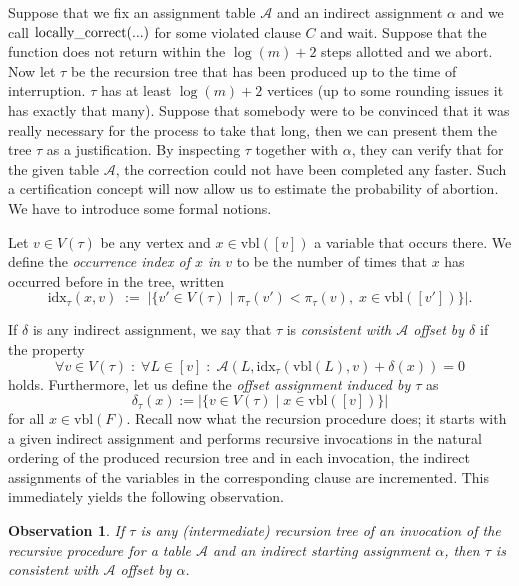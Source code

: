 \documentclass[11pt,a4paper]{article}
\newtheorem{observation}[theorem]{Observation}
\newcommand{\Function}[2]
	{ \mbox{\rm #1}(#2)}
\begin{document}
Suppose that we fix an assignment table $\mathcal{A}$ and an indirect assignment
$\alpha$ and we call $\Function{locally\_correct}{...}$ for some violated clause $C$ and wait.
Suppose that the function does not return within the $\log(m)+2$ steps allotted and we
abort. Now let $\tau$ be the recursion tree that has been produced up to the time of
interruption. $\tau$ has at least $\log(m)+2$ vertices (up to some rounding issues 
it has exactly that many). Suppose that somebody were to be convinced
that it was really necessary for the process to take that long, then we can present them the
tree $\tau$ as a justification. By inspecting $\tau$ together with $\alpha$,
they can verify that for the given table $\mathcal{A}$, the correction could not have been
completed any faster. Such a certification concept will now allow us to
estimate the probability of abortion. We have to introduce some formal notions.

Let $v \in V(\tau)$ be any vertex and $x \in \mbox{vbl}([v])$ a variable that occurs there. 
We define the
\emph{occurrence index of $x$ in $v$} to be the number of times that $x$ has occurred before in
the tree, written
$$ \mbox{idx}_\tau(x,v) \; := \; | \{ v' \in V(\tau) \; | \;  
\pi_\tau(v') < \pi_\tau(v), \; x \in \mbox{vbl}([v'])  \} |. $$

If $\delta$ is any indirect assignment, we say that $\tau$ 
is \emph{consistent with $\mathcal{A}$ offset by $\delta$} if the property
$$ \forall v \in V(\tau) \; : \; \forall L \in [v] \; : \; \mathcal{A}(L, \mbox{idx}_\tau(\mbox{vbl}(L),v)+\delta(x) ) = 0$$
holds. Furthermore, let us define the \emph{offset assignment induced by $\tau$} as
$$ \delta_\tau(x) := | \{ v \in V(\tau) \; | \; x \in \mbox{vbl}([v]) \} |$$
for all $x \in \mbox{vbl}(F)$. Recall now what the recursion procedure does; it starts with a given indirect assignment
and performs recursive invocations in the natural ordering of the produced recursion tree and
in each invocation, the indirect assignments of the variables in the corresponding clause are
incremented. This immediately yields the following observation.

\begin{observation}
\label{obsrectrcons}
If $\tau$ is any (intermediate) recursion tree of an invocation of the recursive procedure for
a table $\mathcal{A}$ and an indirect starting assignment $\alpha$, then $\tau$ is consistent
with $\mathcal{A}$ offset by $\alpha$.
\end{observation}
\end{document}
